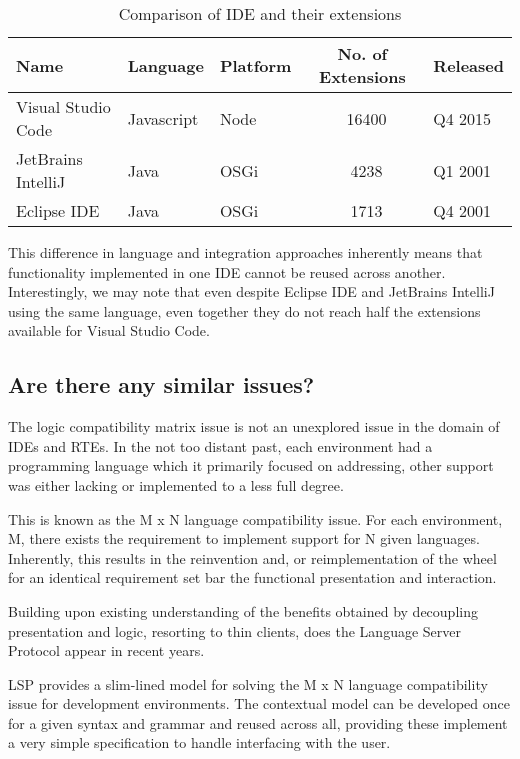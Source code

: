 

\begin{table}[h!]
\centering
\begin{tabular}{|l|l|l|c|l|}
	\hline 
	\rule[-1ex]{0pt}{2.5ex} Name & Language & Platform & No. of Extensions & Released \\ 
	\hline 
	\hline 
	\rule[-1ex]{0pt}{2.5ex} Visual Studio Code & Javascript & Node & ~16400 & Q4 2015\\ 
	\hline 
	\rule[-1ex]{0pt}{2.5ex} JetBrains IntelliJ & Java & OSGi  & ~4238 & Q1 2001 \\ 
	\hline 
	\rule[-1ex]{0pt}{2.5ex} Eclipse IDE & Java & OSGi & ~1713 & Q4 2001 \\ 
	\hline 
\end{tabular} 
\caption{Comparison of IDE and their extensions}
\end{table}

This difference in language and integration approaches inherently means that functionality implemented in one IDE cannot be reused across another. Interestingly, we may note that even despite Eclipse IDE and JetBrains IntelliJ using the same language, even together they do not reach half the extensions available for Visual Studio Code.

\subsection{Are there any similar issues?}

The logic compatibility matrix issue is not an unexplored issue in the domain of IDEs and RTEs. In the not too distant past, each environment had a programming language which it primarily focused on addressing, other support was either lacking or implemented to a less full degree. 

This is known as the M x N language compatibility issue. For each environment, M, there exists the requirement to implement support for N given languages. Inherently, this results in the reinvention and, or reimplementation of the wheel for an identical requirement set bar the functional presentation and interaction.

Building upon existing understanding of the benefits obtained by decoupling presentation and logic, resorting to thin clients, does the Language Server Protocol \parencite{lspGitHubSiteMSFT} appear in recent years.

LSP provides a slim-lined model for solving the M x N language compatibility issue for development environments. The contextual model can be developed once for a given syntax and grammar and reused across all, providing these implement a very simple specification to handle interfacing with the user.

